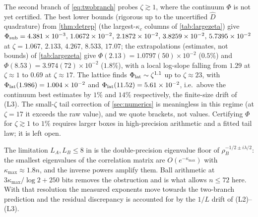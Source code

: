 \begin{remark}\label{rem:largezeta}
The second branch of \eqref{eq:twobranch} probes $\zeta\gtrsim1$, where the
continuum $\Phi$ is not yet certified.  The best lower bounds (rigorous up to the uncertified $\widehat D$ quadrature) from
\cref{thm:detrep} (the largest-$\kappa_c$ columns of \cref{tab:largezeta}) give $\Phi_{\rm sub}=4.381\times10^{-3},\,1.0672\times10^{-2},
\,2.1872\times10^{-2},\,3.8259\times10^{-2},\,5.7395\times10^{-2}$ at
$\zeta=1.067,\,2.133,\,4.267,\,8.533,\,17.07$; the extrapolations (estimates, not bounds) of
\cref{tab:largezeta} give $\Phi(2.13)=1.0797(50)\times10^{-2}$ ($0.5\%$) and
$\Phi(8.53)=3.974(72)\times10^{-2}$ ($1.8\%$), with a local log-slope falling from
$1.29$ at $\zeta\approx1$ to $0.69$ at $\zeta\approx17$.  The lattice finds
$\Phi_{\rm lat}\sim\zeta^{1.1}$ up to $\zeta\approx23$, with
$\Phi_{\rm lat}(1.986)=1.004\times10^{-2}$ and
$\Phi_{\rm lat}(11.52)=5.61\times10^{-2}$, i.e.\ above the continuum best
estimates by $1\%$ and $14\%$ respectively, the finite-size drift of (L3).
The small-$\zeta$ tail correction of \cref{sec:numerics} is meaningless in this
regime (at $\zeta=17$ it exceeds the raw value), and we quote brackets, not
values.  Certifying $\Phi$ for $\zeta\gtrsim1$ to $1\%$ requires larger boxes in
high-precision arithmetic and a fitted tail law; it is left open.
\end{remark}

\begin{remark}
The limitation $L_A,L_B\le8$ in \cite{VWZ} is the double-precision eigenvalue
floor of $\rho_B^{-1/2\pm i\lambda/2}$: the smallest eigenvalues of the correlation
matrix are $O(e^{-\kappa_{\max}})$ with $\kappa_{\max}\approx1.8n$, and the
inverse powers amplify them.  Ball arithmetic at
$3\kappa_{\max}/\log2+250$ bits removes the obstruction and is what allows
$n\le72$ here.  With that resolution the measured exponents move towards the
two-branch prediction and the residual discrepancy is accounted for by the $1/L$
drift of (L2)--(L3).
\end{remark}
